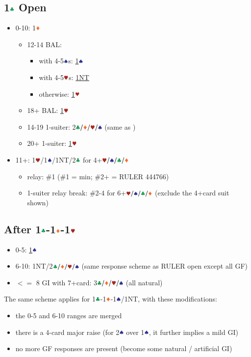 \documentclass{article}
\begin{document}
\begin{multicols}{2}
\section{1$\ccc$ Open}\label{sec:1c}
\begin{itemize}
    \item 0-10: 1$\ddd$
    \begin{itemize}
        \item 12-14 BAL:
        \begin{itemize}
            \item with 4-5$\sss$s: \hyperref[sec:1c1d1h]{1$\sss$}
            \item with 4-5$\hhh$s: \hyperref[sec:1c1d1h]{1NT}
            \item otherwise: \hyperref[sec:1c1d1h]{1$\hhh$}
        \end{itemize}
        \item 18+ BAL: \hyperref[sec:1c1d1h]{1$\hhh$}
        \item 14-19 1-suiter: 2$\ccc/\ddd/\hhh/\sss$ (same as )
        \item 20+ 1-suiter: \hyperref[sec:1c1d1h]{1$\hhh$}
    \end{itemize}
    \item 11+: 1$\hhh$/1$\sss$/1NT/2$\ccc$ 
    for 4+$\hhh/\sss/\ccc/\ddd$
    \begin{itemize}
        \item relay: \#1 (\#1 = min; \#2+ = RULER 444766)
        \item 1-suiter relay break: \#2-4 for 6+$\hhh/\sss/\ccc/\ddd$ (exclude the 4+card suit shown)
    \end{itemize}
\end{itemize}

\subsection{After 1$\ccc$-1$\ddd$-1$\hhh$}\label{sec:1c1d1h}
\begin{itemize}
    \item 0-5: \hyperref[sec:1c1d1h1s]{1$\sss$}
    \item 6-10: 1NT/2$\ccc/\ddd/\hhh/\sss$
        (same response scheme as RULER open except all GF)
    \item $<=$ 8 GI with 7+card: 3$\ccc/\ddd/\hhh/\sss$ (all natural)
\end{itemize}

\noindent The same scheme applies for 1$\ccc$-1$\ddd$-1$\sss$/1NT, with these modifications:
\begin{itemize}
    \item the 0-5 and 6-10 ranges are merged
    \item there is a 4-card major raise (for 2$\sss$ over 1$\sss$, it further implies a mild GI)
    \item no more GF responses are present (become some natural / artificial GI)
\end{itemize}


\end{multicols}
\end{document}
